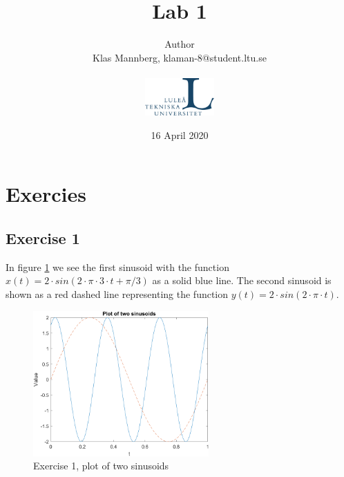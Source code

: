 \documentclass[a4paper]{article}
\title{Lab 1}
\author{
Author \\
{Klas Mannberg,   klaman-8@student.ltu.se
} \\ \\
\includegraphics[width=0.2\textwidth]{ltu_swe.jpg}}
\date{16 April 2020}
\begin{document}
\maketitle

\section{Exercies}
\subsection{Exercise 1}
In figure \ref{fig:1} we see the first sinusoid with the function $x(t) = 2 \cdot sin(2 \cdot \pi \cdot 3 \cdot t+\pi/3)$ as a solid blue line. The second sinusoid is shown as a red dashed line representing the function $y(t) = 2 \cdot sin(2 \cdot \pi \cdot t)$.
\begin{figure}
    \centering
    \includegraphics[width=0.6\textwidth]{1.png}
    \caption{Exercise 1, plot of two sinusoids}
    \label{fig:1}
\end{figure}
\end{document}
